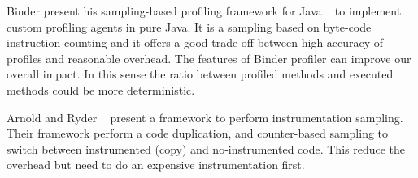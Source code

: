 \documentclass{sig-alternate}
\newcommand{\ra}{$\rightarrow$}
\newcommand{\chg}[2]{\textcolor{red}{\sout{#1}}{\ra}\textcolor{blue}{\uline{#2}}} %
\newcommand{\vp}[1]{\nb{Vanessa}{orange}{#1}}
\begin{document}



Binder present his sampling-based profiling framework for Java ~\cite{Binder:2006:PAS:1133013.1133016} to implement custom profiling agents in pure Java. It is a sampling based on byte-code instruction counting and it offers a good trade-off between high accuracy of profiles and reasonable overhead. The features of Binder profiler can improve our overall impact. In this sense the ratio between profiled methods and executed methods could be more deterministic.





Arnold and Ryder ~\cite{Arno01a} present a framework to perform instrumentation sampling. Their framework perform a code duplication, and counter-based sampling to switch between instrumented (copy) and no-instrumented code. This reduce the overhead but need to do an expensive instrumentation first.
\end{document}
